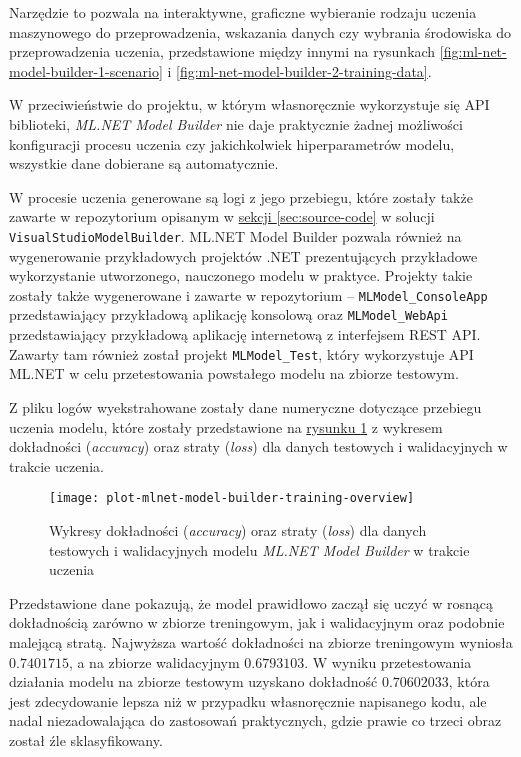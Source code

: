 Narzędzie to pozwala na interaktywne, graficzne wybieranie rodzaju uczenia maszynowego do przeprowadzenia, wskazania danych czy wybrania środowiska do przeprowadzenia uczenia, przedstawione między innymi na rysunkach \ref{fig:ml-net-model-builder-1-scenario} i \ref{fig:ml-net-model-builder-2-training-data}.

W przeciwieństwie do projektu, w którym własnoręcznie wykorzystuje się API biblioteki, \emph{ML.NET Model Builder} nie daje praktycznie żadnej możliwości konfiguracji procesu uczenia czy jakichkolwiek hiperparametrów modelu, wszystkie dane dobierane są automatycznie.

W procesie uczenia generowane są logi z jego przebiegu, które zostały także zawarte w repozytorium opisanym w \hyperref[sec:source-code]{sekcji \ref*{sec:source-code}} w solucji \lstinline{VisualStudioModelBuilder}.
ML.NET Model Builder pozwala również na wygenerowanie przykładowych projektów .NET prezentujących przykładowe wykorzystanie utworzonego, nauczonego modelu w praktyce.
Projekty takie zostały także wygenerowane i zawarte w repozytorium -- \lstinline{MLModel_ConsoleApp} przedstawiający przykładową aplikację konsolową oraz \lstinline{MLModel_WebApi} przedstawiający przykładową aplikację internetową z interfejsem REST API.
Zawarty tam również został projekt \lstinline{MLModel_Test}, który wykorzystuje API ML.NET w celu przetestowania powstałego modelu na zbiorze testowym.

Z pliku logów wyekstrahowane zostały dane numeryczne dotyczące przebiegu uczenia modelu, które zostały przedstawione na \hyperref[fig:plot-mlnet-model-builder-training-overview]{rysunku \ref*{fig:plot-mlnet-model-builder-training-overview}} z wykresem dokładności (\emph{accuracy}) oraz straty (\emph{loss}) dla danych testowych i walidacyjnych w trakcie uczenia.

\begin{figure}[ht]
  \texttt{[image: plot-mlnet-model-builder-training-overview]}
  \caption[Wykresy statystyk modelu ML.NET Model Builder w trakcie uczenia]{Wykresy dokładności (\emph{accuracy}) oraz straty (\emph{loss}) dla danych testowych i walidacyjnych modelu \emph{ML.NET Model Builder} w trakcie uczenia}
  \label{fig:plot-mlnet-model-builder-training-overview}
\end{figure}

Przedstawione dane pokazują, że model prawidłowo zaczął się uczyć w rosnącą dokładnością zarówno w zbiorze treningowym, jak i walidacyjnym oraz podobnie malejącą stratą.
Najwyższa wartość dokładności na zbiorze treningowym wyniosła $0.7401715$, a na zbiorze walidacyjnym $0.6793103$.
W wyniku przetestowania działania modelu na zbiorze testowym uzyskano dokładność $0.70602033$, która jest zdecydowanie lepsza niż w przypadku własnoręcznie napisanego kodu, ale nadal niezadowalająca do zastosowań praktycznych, gdzie prawie co trzeci obraz został źle sklasyfikowany.


